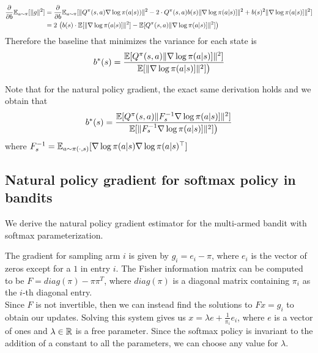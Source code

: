 \begin{align*}
    \frac{\partial}{\partial b}  \mathbb{E}_{a \sim \pi} [\|g\|^2]&= \frac{\partial}{\partial b} \mathbb{E}_{a \sim \pi} [ \| Q^\pi(s,a)\nabla \log \pi (a|s))\|^2 - 2\cdot Q^\pi(s,a) b(s) \|\nabla \log \pi (a|s)]\|^2 + b(s)^2  \|\nabla \log \pi (a|s)]\|^2]\\
    &= 2\ \big( b(s) \cdot \mathbb{E} [\|\nabla \log \pi (a|s)]\|^2] - \mathbb{E} [ Q^\pi(s,a) \|  \nabla \log \pi (a|s)]\|^2] \big)\\
\end{align*}
Therefore the baseline that minimizes the variance for each state is 
$$b^\ast(s) =\frac{ \mathbb{E} [ Q^\pi(s,a) \|  \nabla \log \pi (a|s)]\|^2] }{ \mathbb{E} [ \|  \nabla \log \pi (a|s)]\|^2] \big)} $$

Note that for the natural policy gradient, the exact same derivation holds and we obtain that 
$$b^\ast(s) =\frac{ \mathbb{E} [ Q^\pi(s,a) \|  F^{-1}_s   \nabla \log \pi (a|s)]\|^2] }{ \mathbb{E} [ \| F^{-1}_s  \nabla \log \pi (a|s)]\|^2] \big)} $$ 
where $F^{-1}_s = \mathbb{E}_{a \sim \pi(\cdot,s)} [\nabla \log \pi (a|s) \nabla \log \pi(a|s)^\top]$

\subsection{Natural policy gradient for softmax policy in bandits}
\label{app:npg_softmax_bandit}
We derive the natural policy gradient estimator for the multi-armed bandit with softmax parameterization.

The gradient for sampling arm $i$ is given by $g_i = e_i - \pi$, where $e_i$ is the vector of zeros except for a $1$ in entry $i$. 
The Fisher information matrix can be computed to be $F = diag(\pi) - \pi \pi^T$, where $diag(\pi)$ is a diagonal matrix containing $\pi_i$ as the $i$-th diagonal entry. \\
Since $F$ is not invertible, then we can instead find the solutions to $Fx = g_i$ to obtain our updates.
Solving this system gives us $x = \lambda e + \frac{1}{\pi_i} e_i$, where $e$ is a vector of ones and $\lambda \in \mathbb{R}$ is a free parameter.
Since the softmax policy is invariant to the addition of a constant to all the parameters, we can choose any value for $\lambda$. 


